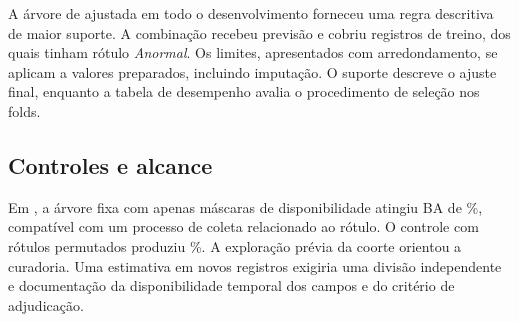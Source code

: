 A árvore de \fisio{} ajustada em todo o desenvolvimento forneceu uma regra descritiva de maior suporte. A combinação \FisioRuleConditions{} recebeu previsão \textit{\FisioRulePredicted{}} e cobriu \FisioRuleN{} registros de treino, dos quais \FisioRuleAnormal{} tinham rótulo \textit{Anormal}. Os limites, apresentados com arredondamento, se aplicam a valores preparados, incluindo imputação. O suporte descreve o ajuste final, enquanto a tabela de desempenho avalia o procedimento de seleção nos folds.

\subsection{Controles e alcance}
Em \fisio{}, a árvore fixa com apenas máscaras de disponibilidade atingiu BA de \FisioMaskBA\%, compatível com um processo de coleta relacionado ao rótulo. O controle com rótulos permutados produziu \FisioNullBA\%. A exploração prévia da coorte orientou a curadoria. Uma estimativa em novos registros exigiria uma divisão independente e documentação da disponibilidade temporal dos campos e do critério de adjudicação.

